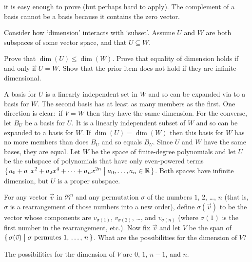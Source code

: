\begin{exercises}
\begin{answer}
\begin{exparts}
           it is easy enough to prove (but perhaps hard to apply).
         \partsitem The complement of a basis cannot be a basis
           because it contains the zero vector.
       \end{exparts}  
     \end{answer}
  \recommended \item 
    Consider how `dimension' interacts with `subset'.
    Assume \( U \) and \( W \) are both subspaces of some vector space, and
    that \( U\subseteq W \).
    \begin{exparts}
      \partsitem Prove that \( \dim (U)\leq\dim (W) \).
      \partsitem Prove that equality of dimension holds
        if and only if \( U=W \).
      \partsitem Show that the prior item does not hold if they are 
        infinite-dimensional.
    \end{exparts}
    \begin{answer}
       \begin{exparts}
          \partsitem A basis for \( U \) is a linearly independent set
            in \( W \)
            and so can be expanded via 
            to a basis for \( W \).
            The second basis has at least as many members as the first.
          \partsitem One direction is clear:~if \( V=W \) then they have the 
            same dimension.
            For the converse, let \( B_U \) be a basis for \( U \).
            It is a linearly independent subset of \( W \) and so can be
            expanded to a basis for \( W \).
            If \( \dim(U)=\dim(W) \) then this basis for \( W \) has no more
            members than does \( B_U \) and so equals \( B_U \).
            Since \( U \) and \( W \) have the same bases, they are equal.
          \partsitem Let \( W \) be the space of finite-degree polynomials and
            let \( U \) be the subspace of polynomials that have only
            even-powered terms
            \( \mbox{$\{\,a_0+a_1x^2+a_2x^4+\dots+a_nx^{2n}\bigm|
                a_0,\ldots,a_n\in\mathbb{R}\,\}$} \).
            Both spaces have infinite dimension, but \( U \) is a proper
            subspace.
       \end{exparts}  
     \end{answer}
  \puzzle \item 
    \cite{Wohascum47}
    For any vector $\vec{v}$ in $\Re^n$ and any permutation $\sigma$
    of the numbers $1$, $2$, \ldots, $n$
    (that is, $\sigma$ is a rearrangement of those numbers into a new order), 
    define $\sigma(\vec{v})$ to be the vector whose components are 
    $v_{\sigma(1)}$, $v_{\sigma(2)}$, \ldots, and $v_{\sigma(n)}$
    (where $\sigma(1)$ is the first number in the rearrangement, etc.).
    Now fix $\vec{v}$ and let $V$ be the span of 
    $\mbox{$\{\,\sigma(\vec{v})\bigm| \mbox{$\sigma$ permutes $1$, \ldots, $n$}\,\}$}$.
    What are the possibilities for the dimension of $V$?
    \begin{answer}
      The possibilities for the dimension of $V$ are $0$, $1$, $n-1$,
      and $n$.


\end{answer}
\end{exercises}
